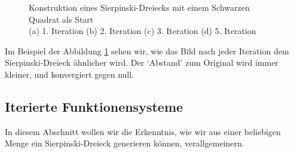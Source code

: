 \begin{figure}	
	\centering
	\caption{Konstruktion eines Sierpinski-Dreiecks mit einem Schwarzen Quadrat als Start\\
		(a) 1. Iteration (b) 2. Iteration (c) 3. Iteration (d) 5. Iteration}
	\label{ifs:sierpconst}
\end{figure}
Im Beispiel der Abbildung \ref{ifs:sierpconst} sehen wir, wie das Bild nach jeder Iteration dem Sierpinski-Dreieck ähnlicher wird.
Der `Abstand' zum Original wird immer kleiner, und konvergiert gegen null.

\subsection{Iterierte Funktionensysteme
\label{ifs:subsection:IteratedFunktionensysteme}}
In diesem Abschnitt wollen wir die Erkenntnis, wie wir aus einer beliebigen Menge ein Sierpinski-Dreieck generieren können, verallgemeinern.


